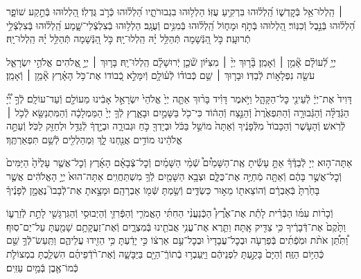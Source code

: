 \documentclass[twoside, openany, parskip=half, 11pt]{book}
\begin{document}
 ׀
הַֽלְלוּ־אֵ֥ל בְּֿקׇדְשׁ֑וֹ  הַֽ֝לְל֗וּהוּ בִּרְקִ֥יעַ עֻזּֽוֹ׃
הַלְל֥וּהוּ בִגְבוּרֹתָ֑יו הַ֝לְל֗וּהוּ כְּֿרֹ֣ב גֻּדְלֽוֹ׃
הַ֭לְלוּהוּ בְּֿתֵ֣קַע שׁוֹפָ֑ר הַ֝לְל֗וּהוּ בְּֿנֵ֣בֶל וְֿכִנּֽוֹר׃
הַ֭לְלוּהוּ בְּֿתֹ֣ף וּמָח֑וֹל הַֽ֝לְל֗וּהוּ בְּֿמִנִּ֥ים וְֿעֻגָֽב׃
הַלְל֥וּהוּ בְֿצִלְצְֿלֵי־שָׁ֑מַע הַֽ֝לְל֗וּהוּ בְּֽֿצִלְצְֿלֵ֥י תְֿרוּעָֽה׃
כֹּ֣ל הַ֭נְּֿשָׁמָה תְּֿהַלֵּ֥ל יָ֗הּ הַֽלְלוּ־יָֽהּ׃
\scriptsize{כֹּ֣ל הַ֭נְּֿשָׁמָה תְּֿהַלֵּ֥ל יָ֗הּ הַֽלְלוּ־יָֽהּ׃ \\}
\normalsize{}

\negline

יְיָ֥ לְֿ֝עוֹלָ֗ם אָ֘מֵ֥ן ׀ וְֿאָמֵֽן׃ \hfill \break
{}בָּ֘ר֤וּךְ יְיָ֨ ׀ מִצִּיּ֗וֹן שֹׁ֘כֵ֤ן יְֽֿרוּשָׁלָ֗‍ִם הַֽלְלוּ־יָֽהּ׃ \hfill \break
{}בָּר֤וּךְ ׀ יְיָ֣ אֱ֭לֹהִים אֱלֹהֵ֣י יִשְׂרָאֵ֑ל עֹשֵׂ֖ה נִפְלָא֣וֹת לְֿבַדּֽוֹ׃ וּבָר֤וּךְ ׀ שֵׁ֥ם כְּֿבוֹד֗וֹ לְֿע֫וֹלָ֥ם וְֿיִמָּלֵ֣א כְֿ֭בוֹדוֹ אֶת־כֹּ֥ל הָאָ֗רֶץ אָ֘מֵ֥ן ׀ וְֿאָמֵֽן׃





דָּוִיד֙ אֶת־יְיָ֔ לְֿעֵינֵ֖י כׇּל־הַקָּהָ֑ל וַיֹּ֣אמֶר דָּוִ֗יד בָּר֨וּךְ אַתָּ֤ה יְיָ֙ אֱלֹהֵי֙ יִשְׂרָאֵ֣ל אָבִ֔ינוּ מֵעוֹלָ֖ם וְֿעַד־עוֹלָֽם׃
לְֿךָ֣ יְ֠יָ֠ הַגְּֿדֻלָּ֨ה וְֿהַגְּֿבוּרָ֤ה וְֿהַתִּפְאֶ֙רֶת֙ וְֿהַנֵּ֣צַח וְֿהַה֔וֹד כִּי־כֹ֖ל בַּשָּׁמַ֣יִם וּבָאָ֑רֶץ לְֿךָ֤ יְיָ֙ הַמַּמְלָכָ֔ה וְֿהַמִּתְנַשֵּׂ֖א לְֿכֹ֥ל ׀ לְֿרֹֽאשׁ׃
וְֿהָעֹ֤שֶׁר וְֿהַכָּבוֹד֙ מִלְּֿפָנֶ֔יךָ וְֿאַתָּה֙ מוֹשֵׁ֣ל בַּכֹּ֔ל וּבְיָדְךָ֖ כֹּ֣חַ וּגְבוּרָ֑ה וּבְיָ֣דְךָ֔ לְֿגַדֵּ֥ל וּלְחַזֵּ֖ק לַכֹּֽל׃
וְֿעַתָּ֣ה אֱלֹהֵ֔ינוּ מוֹדִ֥ים אֲנַ֖חְנוּ לָ֑ךְ וּֽמְהַלְלִ֖ים לְֿשֵׁ֥ם תִּפְאַרְתֶּֽךָ׃





אַתָּה־ה֣וּא
יְיָ לְֿבַדֶּ֒ךָ֒ אַתָּ֣ עָשִׂ֡יתָ אֶֽת־הַשָּׁמַ֩יִם֩ שְֿׁמֵ֨י הַשָּׁמַ֜יִם וְֿכׇל־צְֿבָאָ֗ם הָאָ֜רֶץ וְֿכׇל־אֲשֶׁ֤ר עָלֶ֙יהָ֙ הַיַּמִּים֙ וְֿכׇל־אֲשֶׁ֣ר בָּהֶ֔ם וְֿאַתָּ֖ה מְֿחַיֶּ֣ה אֶת־כֻּלָּ֑ם וּצְבָ֥א הַשָּׁמַ֖יִם לְֿךָ֥ מִשְׁתַּחֲוִֽים׃
אַתָּה־הוּא֙ יְיָ֣ הָאֱלֹהִ֔ים אֲשֶׁ֤ר בָּחַ֙רְתָּ֙ בְּֿאַבְרָ֔ם וְֿהוֹצֵאת֖וֹ מֵא֣וּר כַּשְׂדִּ֑ים וְֿשַׂ֥מְתָּ שְּֿׁמ֖וֹ אַבְרָהָֽם׃ וּמָצָ֣אתָ אֶת־לְֿבָבוֹ֮ נֶאֱמָ֣ן לְֿפָנֶ֒יךָ֒

וְֿכָר֨וֹת עִמּ֜וֹ הַבְּֿרִ֗ית לָתֵ֡ת אֶת־אֶ֩רֶץ֩ הַכְּֿנַעֲנִ֨י הַחִתִּ֜י הָאֱמֹרִ֧י וְֿהַפְּֿרִזִּ֛י וְֿהַיְבוּסִ֥י וְֿהַגִּרְגָּשִׁ֖י לָתֵ֣ת לְֿזַרְע֑וֹ וַתָּ֙קֶם֙ אֶת־דְּֿבָרֶ֔יךָ כִּ֥י צַדִּ֖יק אָֽתָּה׃ וַתֵּ֛רֶא אֶת־עֳנִ֥י אֲבֹתֵ֖ינוּ בְּֿמִצְרָ֑יִם וְֿאֶת־זַעֲקָתָ֥ם שָׁמַ֖עְתָּ עַל־יַם־סֽוּף׃ וַ֠תִּתֵּ֠ן אֹתֹ֨ת וּמֹֽפְֿתִ֜ים בְּֿפַרְעֹ֤ה וּבְכׇל־עֲבָדָיו֙ וּבְכׇל־עַ֣ם אַרְצ֔וֹ כִּ֣י יָדַ֔עְתָּ כִּ֥י הֵזִ֖ידוּ עֲלֵיהֶ֑ם וַתַּֽעַשׂ־לְֿךָ֥ שֵׁ֖ם כְּֿהַיּ֥וֹם הַזֶּֽה׃
וְֿהַיָּם֙ בָּקַ֣עְתָּ לִפְנֵיהֶ֔ם וַיַּֽעַבְר֥וּ בְֿתוֹךְֿ־הַיָּ֖ם בַּיַּבָּשָׁ֑ה וְֽֿאֶת־רֹ֨דְֿפֵיהֶ֜ם הִשְׁלַ֧כְתָּ בִמְצוֹלֹ֛ת כְּֿמוֹ־אֶ֖בֶן בְּֿמַ֥יִם עַזִּֽים׃
\end{document}
